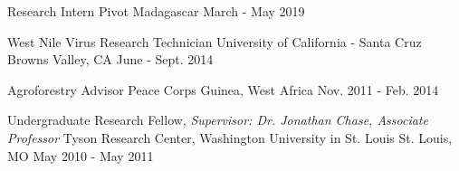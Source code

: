 

\begin{cventries}

  \cventry
    {Research Intern} %
    {Pivot} %
    {Madagascar} %
    {March - May 2019} %
  {}%

  \cventry
    {West Nile Virus Research Technician} %
    {University of California - Santa Cruz} %
    {Browns Valley, CA} %
    {June - Sept. 2014} %
  {}%

  \cventry
    {Agroforestry Advisor} %
    {Peace Corps} %
    {Guinea, West Africa} %
    {Nov. 2011 - Feb. 2014} %
{}%

  \cventry
    {Undergraduate Research Fellow, \textit{Supervisor: Dr. Jonathan Chase, Associate Professor}} %
    {Tyson Research Center, Washington University in St. Louis} %
    {St. Louis, MO} %
    {May 2010 - May 2011} %
{} %

\end{cventries}
